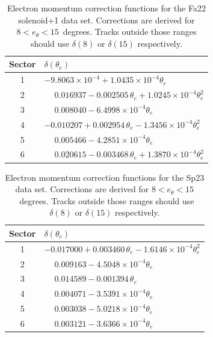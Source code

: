 \begin{table}[htbp]
\centering
\begin{tabular}{cl}
\toprule
Sector & $\delta(\theta_e)$ \\
\midrule
1 & $-9.8063\times10^{-4} + 1.0435\times10^{-4}\theta_e$ \\
2 & $\phantom{-}0.016937 - 0.002505\,\theta_e + 1.0245\times10^{-4}\theta_e^2$ \\
3 & $\phantom{-}0.008040 - 6.4998\times10^{-4}\theta_e$ \\
4 & $-0.010207 + 0.002954\,\theta_e - 1.3456\times10^{-4}\theta_e^2$ \\
5 & $\phantom{-}0.005466 - 4.2851\times10^{-4}\theta_e$ \\
6 & $\phantom{-}0.020615 - 0.003468\,\theta_e + 1.3870\times10^{-4}\theta_e^2$ \\
\bottomrule
\end{tabular}
\caption{Electron momentum correction functions for the Fa22 solenoid+1 data set. Corrections are derived for $8 < e_\theta < 15$~degrees. Tracks outside those ranges should use $\delta(8)$ or $\delta(15)$ respectively.}
\label{tab:Fa22+1_electron_momentum_corrections}
\end{table}

\begin{table}[htbp]
\centering
\begin{tabular}{cl}
\toprule
Sector & $\delta(\theta_e)$\\
\midrule
1 & $-0.017000 + 0.003460\,\theta_e - 1.6146\times10^{-4}\theta_e^2$ \\
2 & $\phantom{-}0.009163 - 4.5048\times10^{-4}\theta_e$ \\
3 & $\phantom{-}0.014589 - 0.001394\,\theta_e$ \\
4 & $\phantom{-}0.004071 - 3.5391\times10^{-4}\theta_e$ \\
5 & $\phantom{-}0.003038 - 5.0218\times10^{-4}\theta_e$ \\
6 & $\phantom{-}0.003121 - 3.6366\times10^{-4}\theta_e$ \\
\bottomrule
\end{tabular}
\caption{Electron momentum correction functions for the Sp23 data set. Corrections are derived for $8 < e_\theta < 15$~degrees. Tracks outside those ranges should use $\delta(8)$ or $\delta(15)$ respectively.}
\label{tab:Sp23_electron_momentum_corrections}
\end{table}  

